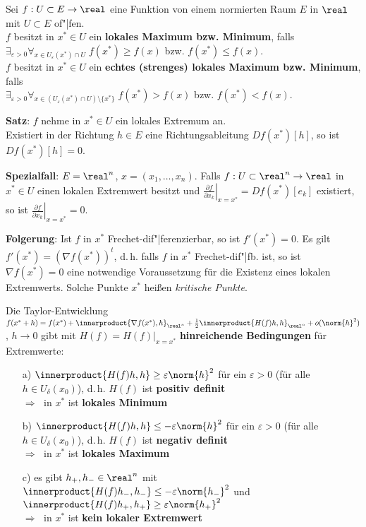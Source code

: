 Sei $f: U \subset E \rightarrow \real$ eine Funktion von einem normierten
Raum $E$ in $\real$ mit $U \subset E$ of"|fen. \\
$f$ besitzt in $x^\ast \in U$ ein \textbf{lokales Maximum bzw. Minimum},
falls \\
$\exists_{\varepsilon > 0} \forall_{x \in U_\varepsilon(x^\ast) \cap U}\;
f(x^\ast) \ge f(x)$ bzw. $f(x^\ast) \le f(x)$. \\
$f$ besitzt in $x^\ast \in U$ ein
\textbf{echtes (strenges) lokales Maximum bzw. Minimum}, falls \\
$\exists_{\varepsilon > 0} \forall_{x \in
(U_\varepsilon(x^\ast) \cap U) \setminus \{x^\ast\}}\;
f(x^\ast) > f(x)$ bzw. $f(x^\ast) < f(x)$.

\linie

\textbf{Satz}:
$f$ nehme in $x^\ast \in U$ ein lokales Extremum an. \\
Existiert in der Richtung $h \in E$ eine Richtungsableitung
$Df(x^\ast)[h]$, so ist $Df(x^\ast)[h] = 0$.

\textbf{Spezialfall}:
$E = \real^n$, $x = (x_1, \dotsc, x_n)$.
Falls $f: U \subset \real^n \rightarrow \real$ in $x^\ast \in U$ einen
lokalen Extremwert besitzt und
$\left.\frac{\partial f}{\partial x_k}\right|_{x=x^\ast} = Df(x^\ast)[e_k]$
existiert, so ist
$\left.\frac{\partial f}{\partial x_k}\right|_{x=x^\ast} = 0$.

\textbf{Folgerung}:
Ist $f$ in $x^\ast$ Frechet-dif"|ferenzierbar, so ist
$f'(x^\ast) = 0$.
Es gilt $f'(x^\ast) = (\nabla f(x^\ast))^t$, d.\,h.
falls $f$ in $x^\ast$ Frechet-dif"|fb. ist, so ist $\nabla f(x^\ast) = 0$
eine notwendige Voraussetzung für die Existenz eines lokalen Extremwerts.
Solche Punkte $x^\ast$ heißen \emph{kritische Punkte}.

\linie

Die Taylor-Entwicklung
$f(x^\ast + h) = f(x^\ast) + \innerproduct{\nabla f(x^\ast), h}_{\real^n} +
\frac{1}{2} \innerproduct{H(f)h, h}_{\real^n} + o(\norm{h}^2)$, $h \to 0$
gibt mit $H(f) = \left.H(f)\right|_{x=x^\ast}$
\textbf{hinreichende Bedingungen} für Extremwerte:
\begin{itemize}
    \item[a)]
    $\innerproduct{H(f)h, h} \ge \varepsilon \norm{h}^2$ für ein $\varepsilon > 0$
    (für alle $h \in U_\delta(x_0)$), d.\,h. $H(f)$ ist
    \textbf{positiv definit} \\
    $\Rightarrow\;$ in $x^\ast$ ist \textbf{lokales Minimum}

    \item[b)]
    $\innerproduct{H(f)h, h} \le -\varepsilon \norm{h}^2$ für ein $\varepsilon > 0$
    (für alle $h \in U_\delta(x_0)$), d.\,h. $H(f)$ ist
    \textbf{negativ definit} \\
    $\Rightarrow\;$ in $x^\ast$ ist \textbf{lokales Maximum}

    \item[c)]
    es gibt $h_+, h_- \in \real^n$ mit
    $\innerproduct{H(f)h_-, h_-} \le -\varepsilon \norm{h_-}^2$ und
    $\innerproduct{H(f)h_+, h_+} \ge \varepsilon \norm{h_+}^2$ \\
    $\Rightarrow\;$ in $x^\ast$ ist \textbf{kein lokaler Extremwert}
\end{itemize}

